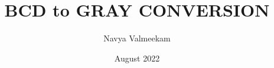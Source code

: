 \documentclass{article}
\title{BCD to GRAY CONVERSION}
\author{Navya Valmeekam}
\date{August 2022}
\begin{document}
\maketitle








\renewcommand\thesection{\arabic{section}}
\renewcommand\thesubsection{\thesection.\arabic{subsection}}
\renewcommand\thesubsubsection{\thesubsection.\arabic{subsubsection}}




\def\inputGnumericTable{}                                 %

\end{document}
